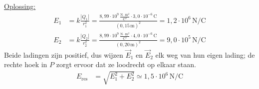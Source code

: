 \documentclass{ximera}
\begin{document}
\begin{exercise}
\begin{solution}
        \underline{Oplossing:}\\
        \begin{align*}
            E_{1} &= k \frac{|Q_{1}|}{r_{1}^{2}} = \frac{8{,}99 \cdot 10^{9} \, \mathrm{\frac{N \cdot m^2}{C^2}} \cdot 3{,}0 \cdot 10^{-6} \, \mathrm{C}}{(0{,}15 \, \mathrm{m})^{2}} = 1{,}2 \cdot 10^{6} \, \mathrm{N/C} \\
            E_{2} &= k \frac{|Q_{2}|}{r_{2}^{2}} = \frac{8{,}99 \cdot 10^{9} \, \mathrm{\frac{N \cdot m^2}{C^2}} \cdot 4{,}0 \cdot 10^{-6} \, \mathrm{C}}{(0{,}20 \, \mathrm{m})^{2}} = 9{,}0 \cdot 10^{5} \, \mathrm{N/C}
        \end{align*}
        Beide ladingen zijn positief, dus wijzen $\vec{E}_1$ en $\vec{E}_2$ elk weg van hun eigen lading; de rechte hoek in $P$ zorgt ervoor dat ze loodrecht op elkaar staan.
        \begin{align*}
            E_{\text{res}} &= \sqrt{E_1^{2} + E_2^{2}} \simeq \boxed{1{,}5 \cdot 10^{6} \, \mathrm{N/C}}
        \end{align*}
    \end{solution}
\end{exercise}
\end{document}

